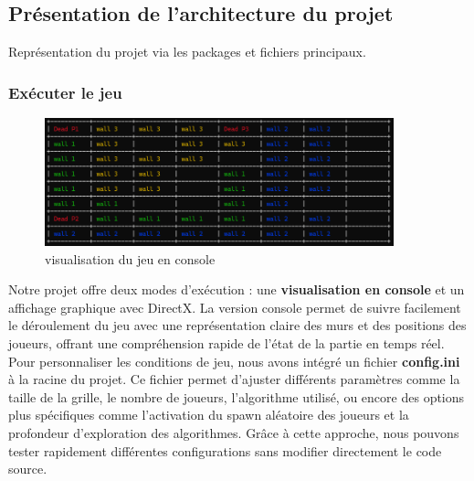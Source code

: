 \subsection{Présentation de l'architecture du projet}
Représentation du projet via les packages et fichiers principaux.

\subsubsection{Exécuter le jeu}
\begin{figure}[h]
	\centering
	\includegraphics[width=0.9\textwidth]{images/ConsoleGame.png}
	\caption{visualisation du jeu en console}
	\label{ConsoleGame}
\end{figure}
Notre projet offre deux modes d'exécution : une \textbf{visualisation en console} et un affichage graphique avec DirectX. La version console permet de suivre facilement le déroulement du jeu avec une représentation claire des murs et des positions des joueurs, offrant une compréhension rapide de l’état de la partie en temps réel. \\
Pour personnaliser les conditions de jeu, nous avons intégré un fichier \textbf{config.ini} à la racine du projet. Ce fichier permet d'ajuster différents paramètres comme la taille de la grille, le nombre de joueurs, l’algorithme utilisé, ou encore des options plus spécifiques comme l’activation du spawn aléatoire des joueurs et la profondeur d’exploration des algorithmes. Grâce à cette approche, nous pouvons tester rapidement différentes configurations sans modifier directement le code source.

